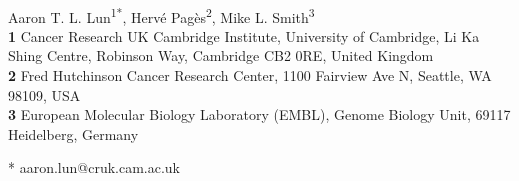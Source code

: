 \documentclass[10pt,letterpaper]{article}
\date{}
\begin{document}
\begin{flushleft}
{\Large
    \textbf{} %
}
\newline
\\

Aaron T. L. Lun\textsuperscript{1*},
Herv\'e Pag\`es\textsuperscript{2},
Mike L. Smith\textsuperscript{3}
\\
\bigskip
\textbf{1} Cancer Research UK Cambridge Institute, University of Cambridge, Li Ka Shing Centre, Robinson Way, Cambridge CB2 0RE, United Kingdom 
\\
\textbf{2} Fred Hutchinson Cancer Research Center, 1100 Fairview Ave N, Seattle, WA 98109, USA
 \\
\textbf{3} European Molecular Biology Laboratory (EMBL), Genome Biology Unit, 69117 Heidelberg, Germany
\\
\bigskip


* aaron.lun@cruk.cam.ac.uk

\end{flushleft}
\end{document}
